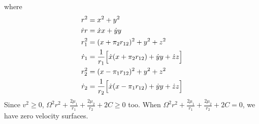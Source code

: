 where
\begin{align*}
  r^2 & = x^2 + y^2\\
  \dot{r}r & = \dot{x}x + \dot{y}y\\
  r_1^2 & = (x + \pi_2r_{12})^2 + y^2 + z^2\\
  \dot{r}_1
      & =  \frac{1}{r_1}\Bigl[\dot{x}(x + \pi_2r_{12}) + \dot{y}y
        + \dot{z}z\Bigr]\\
  r_2^2 & = (x - \pi_1r_{12})^2 + y^2 + z^2\\
  \dot{r}_2
      & =  \frac{1}{r_2}\Bigl[\dot{x}(x - \pi_1r_{12}) + \dot{y}y
        + \dot{z}z\Bigr]
\end{align*}
Since \(v^2 \geq 0\),
\(\varOmega^2r^2 + \frac{2\mu_1}{r_1} + \frac{2\mu_2}{r_2} + 2C \geq 0\) too.
When \(\varOmega^2r^2 + \frac{2\mu_1}{r_1} + \frac{2\mu_2}{r_2} + 2C = 0\), we
have zero velocity surfaces.
